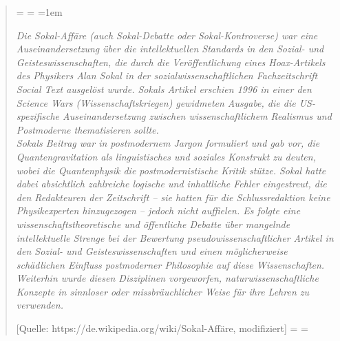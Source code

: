 \documentclass[12pt,a4paper,twoside]{article}
\newcommand{\FSUBreak}{}
\newcommand{\FSUBreak}{\clearpage}
\newenvironment{spread}
{%
  \newdimen\origiwspc%
  \newdimen\origiwstr%
  \origiwspc=\fontdimen2\font%
  \origiwstr=\fontdimen3\font%
  \fontdimen2\font=1em%
  \doublespacing%
}{%
  \fontdimen2\font=\origiwspc%
  \fontdimen3\font=\origiwstr%
}
\begin{document}
\begin{quote}
  \begin{spread}
  \it Die Sokal-Affäre (auch Sokal-Debatte oder Sokal-Kontroverse) war eine Auseinandersetzung über die intellektuellen Standards in den Sozial- und Geisteswissenschaften, die durch die Veröffentlichung eines Hoax-Artikels des Physikers Alan Sokal in der sozialwissenschaftlichen Fachzeitschrift Social Text ausgelöst wurde. Sokals Artikel erschien 1996 in einer den Science Wars (Wissenschaftskriegen) gewidmeten Ausgabe, die die US-spezifische Auseinandersetzung zwischen wissenschaftlichem Realismus und Postmoderne thematisieren sollte.\\
Sokals Beitrag war in postmodernem Jargon formuliert und gab vor, die Quantengravitation als linguistisches und soziales Konstrukt zu deuten, wobei die Quantenphysik die postmodernistische Kritik stütze. Sokal hatte dabei absichtlich zahlreiche logische und inhaltliche Fehler eingestreut, die den Redakteuren der Zeitschrift – sie hatten für die Schlussredaktion keine Physikexperten hinzugezogen – jedoch nicht auffielen. Es folgte eine wissenschaftstheoretische und öffentliche Debatte über mangelnde intellektuelle Strenge bei der Bewertung pseudowissenschaftlicher Artikel in den Sozial- und Geisteswissenschaften und einen möglicherweise schädlichen Einfluss postmoderner Philosophie auf diese Wissenschaften. Weiterhin wurde diesen Disziplinen vorgeworfen, naturwissenschaftliche Konzepte in sinnloser oder missbräuchlicher Weise für ihre Lehren zu verwenden.

  \footnotesize{[Quelle: https://de.wikipedia.org/wiki/Sokal-Affäre, modifiziert]}
  \end{spread}
\end{quote}

\FSUBreak
\end{document}
